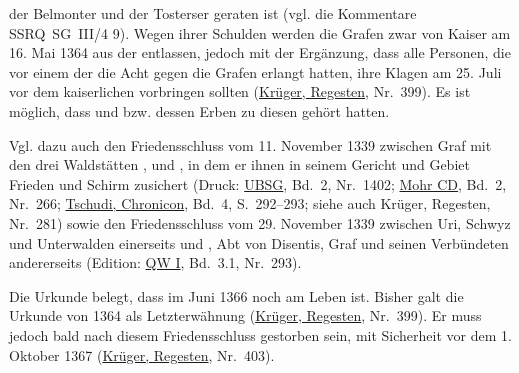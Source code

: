 \documentclass[10pt,twoside]{article}
\begin{document}
\begin{introlist}
{               der Belmonter und der Tosterser  geraten ist (vgl.
               die Kommentare SSRQ~SG~III/4 9). Wegen ihrer Schulden werden die Grafen
               zwar von Kaiser  am 16. Mai 1364 aus der 
               entlassen, jedoch mit der Ergänzung, dass alle Personen, die vor einem der  die Acht gegen die Grafen erlangt hatten,
               ihre Klagen am 25. Juli vor dem kaiserlichen  vorbringen sollten (\href{http://permalink.snl.ch/bib/chbsg000141369}{Krüger, Regesten},
                  Nr. 399). Es ist möglich, dass 
               und  bzw. dessen Erben zu diesen  gehört hatten.


         
}
         \item {
            Vgl. dazu auch den Friedensschluss vom 11. November
                  1339 zwischen Graf  mit den drei Waldstätten ,  und
                  , in dem er ihnen in seinem Gericht
               und Gebiet Frieden und Schirm zusichert (Druck: \href{http://permalink.snl.ch/bib/chbsg000135621}{UBSG}, Bd. 2,
                  Nr. 1402; \href{http://permalink.snl.ch/bib/chbsg000142708}{Mohr CD}, Bd. 2, Nr. 266; \href{http://permalink.snl.ch/bib/chbsg000071960}{Tschudi, Chronicon},
                  Bd. 4, S. 292–293; siehe auch Krüger, Regesten,
                  Nr. 281) sowie den Friedensschluss vom 29. November
                  1339 zwischen Uri, Schwyz und Unterwalden einerseits und , Abt von Disentis, Graf
                   und
               seinen Verbündeten andererseits (Edition: \href{http://permalink.snl.ch/bib/chbsg000102701}{QW I}, Bd. 3.1,
                  Nr. 293).


         
}
         \item {
            Die Urkunde belegt, dass  im Juni 1366 noch am Leben ist. Bisher galt
     die Urkunde von 1364 als Letzterwähnung (\href{http://permalink.snl.ch/bib/chbsg000141369}{Krüger, Regesten},
     Nr. 399). Er muss jedoch bald nach diesem Friedensschluss gestorben sein, mit
     Sicherheit vor dem 1. Oktober 1367 (\href{http://permalink.snl.ch/bib/chbsg000141369}{Krüger, Regesten},
      Nr. 403).


         
}
      
\end{introlist}
\end{document}
